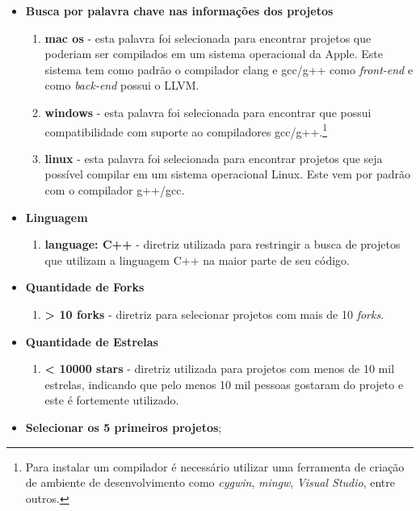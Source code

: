 \begin{itemize}
    \item \textbf{Busca por palavra chave nas informações dos projetos}
        \begin{enumerate}[label=\roman* )]
        \item \textbf{mac os} - esta palavra foi selecionada para encontrar projetos
 que poderiam ser compilados em um sistema operacional da Apple. Este sistema tem
 como padrão o compilador clang e gcc/g++ como \textit{front-end}  e como \textit{back-end} possui o LLVM.
        \item \textbf{windows} - esta palavra foi selecionada para encontrar 
 que possui compatibilidade com suporte ao compiladores gcc/g++.\footnote{Para instalar um compilador é necessário utilizar uma ferramenta de criação de ambiente de desenvolvimento como \textit{cygwin}, \textit{mingw}, \textit{Visual Studio}, entre outros.}
        \item \textbf{linux} - esta palavra foi selecionada para encontrar projetos
 que seja possível compilar em um sistema operacional Linux. Este vem por padrão com
 o compilador g++/gcc.
        \end{enumerate}
    \item \textbf{Linguagem}
        \begin{enumerate}[label=\roman* )]
            \item \textbf{language: C++} - diretriz utilizada para restringir a busca de 
projetos que utilizam a linguagem C++ na maior parte de seu código.
        \end{enumerate}
    \item \textbf{Quantidade de Forks}
        \begin{enumerate}[label=\roman* )]
            \item \textbf{ > 10 forks} - diretriz para selecionar projetos com
 mais de 10 \textit{forks}.
        \end{enumerate}
    \item \textbf{Quantidade de Estrelas}
        \begin{enumerate}[label=\roman* )]
            \item \textbf{ < 10000 stars } - diretriz utilizada para projetos com menos
 de 10 mil estrelas, indicando que pelo menos 10 mil pessoas gostaram do projeto e este
é fortemente utilizado. 
        \end{enumerate}
	\item \textbf{Selecionar os 5 primeiros projetos};
\end{itemize}

